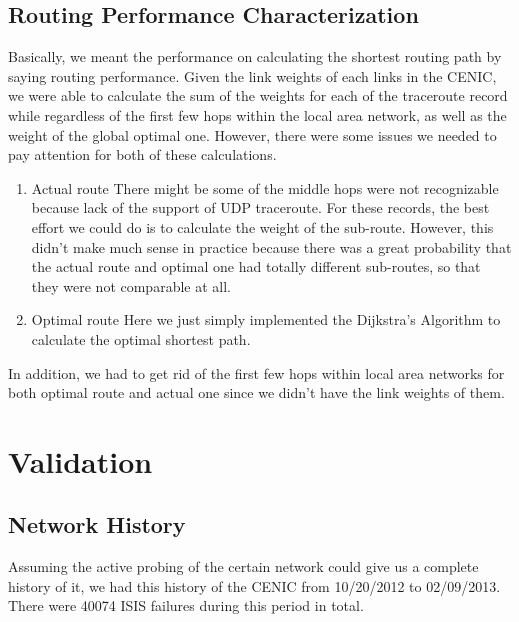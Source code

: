 \documentclass[conference, twocolumn, oneside, 10pt]{IEEEtran}
\begin{document}
\subsection{Routing Performance Characterization}

Basically, we meant the performance on calculating the shortest routing path by saying routing performance. Given the link weights of each links in the CENIC, we were able to calculate the sum of the weights for each of the traceroute record while regardless of the first few hops within the local area network, as well as the weight of the global optimal one. However, there were some issues we needed to pay attention for both of these calculations.

\begin{enumerate}

\item{Actual route} There might be some of the middle hops were not recognizable because lack of the support of UDP traceroute. For these records, the best effort we could do is to calculate the weight of the sub-route. However, this didn't make much sense in practice because there was a great probability that the actual route and optimal one had totally different sub-routes, so that they were not comparable at all.

\item{Optimal route} Here we just simply implemented the Dijkstra's Algorithm to calculate the optimal shortest path.

\end{enumerate}

In addition, we had to get rid of the first few hops within local area networks for both optimal route and actual one since we didn't have the link weights of them.

\section{Validation}
\label{sec:sec5}

\subsection{Network History}

Assuming the active probing of the certain network could give us a complete history of it, we had this history of the CENIC from 10/20/2012 to 02/09/2013. There were 40074 ISIS failures during this period in total.
\end{document}

